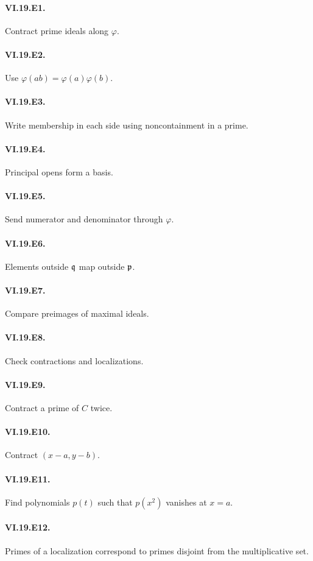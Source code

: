 \paragraph{VI.19.E1.} Contract prime ideals along $\varphi$.
\paragraph{VI.19.E2.} Use $\varphi(ab)=\varphi(a)\varphi(b)$.
\paragraph{VI.19.E3.} Write membership in each side using noncontainment in a prime.
\paragraph{VI.19.E4.} Principal opens form a basis.
\paragraph{VI.19.E5.} Send numerator and denominator through $\varphi$.
\paragraph{VI.19.E6.} Elements outside $\mathfrak q$ map outside $\mathfrak p$.
\paragraph{VI.19.E7.} Compare preimages of maximal ideals.
\paragraph{VI.19.E8.} Check contractions and localizations.
\paragraph{VI.19.E9.} Contract a prime of $C$ twice.
\paragraph{VI.19.E10.} Contract $(x-a,y-b)$.
\paragraph{VI.19.E11.} Find polynomials $p(t)$ such that $p(x^2)$ vanishes at $x=a$.
\paragraph{VI.19.E12.} Primes of a localization correspond to primes disjoint from the multiplicative set.
